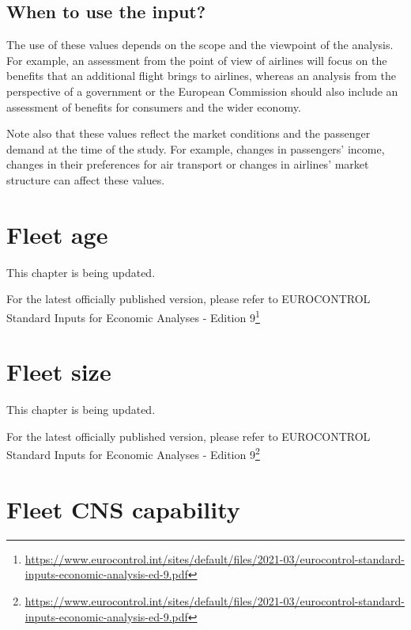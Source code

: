 \documentclass[
  11pt,
  a4paper,
]{book}
\DeclareRobustCommand{\href}[2]{#2\footnote{\url{#1}}}
\begin{document}
\hypertarget{when-to-use-the-input-7}{%
\section{When to use the input?}\label{when-to-use-the-input-7}}

The use of these values depends on the scope and the viewpoint of the
analysis. For example, an assessment from the point of view of airlines
will focus on the benefits that an additional flight brings to airlines,
whereas an analysis from the perspective of a government or the European
Commission should also include an assessment of benefits for consumers
and the wider economy.

Note also that these values reflect the market conditions and the
passenger demand at the time of the study. For example, changes in
passengers' income, changes in their preferences for air transport or
changes in airlines' market structure can affect these values.

\hypertarget{sec-fleet-age}{%
\chapter{Fleet age}\label{sec-fleet-age}}

This chapter is being updated.

For the latest officially published version, please refer to
\href{https://www.eurocontrol.int/sites/default/files/2021-03/eurocontrol-standard-inputs-economic-analysis-ed-9.pdf}{EUROCONTROL
Standard Inputs for Economic Analyses - Edition 9}

\hypertarget{sec-fleet-size}{%
\chapter{Fleet size}\label{sec-fleet-size}}

This chapter is being updated.

For the latest officially published version, please refer to
\href{https://www.eurocontrol.int/sites/default/files/2021-03/eurocontrol-standard-inputs-economic-analysis-ed-9.pdf}{EUROCONTROL
Standard Inputs for Economic Analyses - Edition 9}

\hypertarget{sec-fleet-cns-capability}{%
\chapter{Fleet CNS capability}\label{sec-fleet-cns-capability}}
\end{document}
